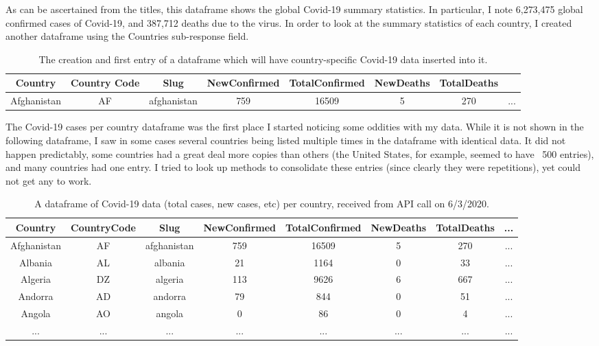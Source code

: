 \documentclass[]{article}
\begin{document}
As can be ascertained from the titles, this dataframe shows the global Covid-19 summary statistics.  In particular, I note 6,273,475 global confirmed cases of Covid-19, and 387,712 deaths due to the virus.  In order to look at the summary statistics of each country, I created another dataframe using the Countries sub-response field.  

\begin{table}[!ht]
	\begin{center}
		\caption{The creation and first entry of a dataframe which will have country-specific Covid-19 data inserted into it.}
		\label{tab:table1}
		\begin{tabular}{|c|c|c|c|c|c|c|c|}
			\hline
			Country&Country Code&Slug&NewConfirmed&TotalConfirmed&NewDeaths&TotalDeaths&\\
		
			\hline
				Afghanistan&	AF&	afghanistan&	759&	16509&	5	&270&	...\\
			\hline
		\end{tabular}
	\end{center}
\end{table}

The Covid-19 cases per country dataframe was the first place I started noticing some oddities with my data.  While it is not shown in the following dataframe, I saw in some cases several countries being listed multiple times in the dataframe with identical data.  It did not happen predictably, some countries had a great deal more copies than others (the United States, for example, seemed to have ~500 entries), and many countries had one entry.  I tried to look up methods to consolidate these entries (since clearly they were repetitions), yet could not get any to work.  

\begin{table}[!ht]
	\begin{center}
		\caption{A dataframe of Covid-19 data (total cases, new cases, etc) per country, received from API call on 6/3/2020.}
		\label{tab:table1}
		\begin{tabular}{|c|c|c|c|c|c|c|c|}
			\hline
			Country&CountryCode&Slug&NewConfirmed&TotalConfirmed&NewDeaths&TotalDeaths&...\\
			\hline
				Afghanistan	&AF&	afghanistan&	759	&16509&	5&	270&...	\\
				Albania&	AL&	albania&	21&	1164&	0&	33&...	\\
				Algeria&	DZ&	algeria&	113&	9626&	6&	667&...	\\
				Andorra&	AD&	andorra	&79	&844&	0&	51&...	\\
				Angola&	AO&	angola&	0&	86&	0&	4&...\\
				...&...	&...&...&...&...&...&...\\
			\hline
		\end{tabular}
	\end{center}
\end{table}
\end{document}
